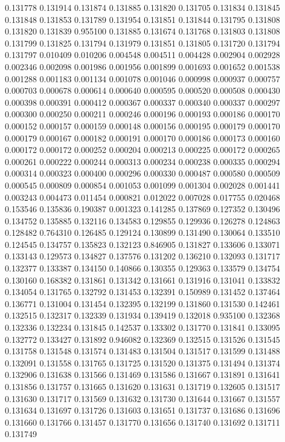 0.131778
0.131914
0.131874
0.131885
0.131820
0.131705
0.131834
0.131845
0.131848
0.131853
0.131789
0.131954
0.131851
0.131844
0.131795
0.131808
0.131820
0.131839
0.955100
0.131885
0.131674
0.131768
0.131803
0.131808
0.131799
0.131825
0.131794
0.131979
0.131851
0.131805
0.131720
0.131794
0.131797
0.010409
0.010206
0.004548
0.004511
0.004428
0.002904
0.002928
0.002346
0.002098
0.001986
0.001956
0.001899
0.001693
0.001652
0.001538
0.001288
0.001183
0.001134
0.001078
0.001046
0.000998
0.000937
0.000757
0.000703
0.000678
0.000614
0.000640
0.000595
0.000520
0.000508
0.000430
0.000398
0.000391
0.000412
0.000367
0.000337
0.000340
0.000337
0.000297
0.000300
0.000250
0.000211
0.000246
0.000196
0.000193
0.000186
0.000170
0.000152
0.000157
0.000159
0.000148
0.000156
0.000195
0.000179
0.000170
0.000179
0.000167
0.000182
0.000191
0.000170
0.000186
0.000173
0.000160
0.000172
0.000172
0.000252
0.000204
0.000213
0.000225
0.000172
0.000265
0.000261
0.000222
0.000244
0.000313
0.000234
0.000238
0.000335
0.000294
0.000314
0.000323
0.000400
0.000296
0.000330
0.000487
0.000580
0.000509
0.000545
0.000809
0.000854
0.001053
0.001099
0.001304
0.002028
0.001441
0.003243
0.004473
0.011454
0.000821
0.012022
0.007028
0.017755
0.020468
0.153546
0.135836
0.190387
0.001323
0.141285
0.137869
0.127352
0.130496
0.134752
0.135885
0.132116
0.134583
0.129855
0.129936
0.126278
0.124863
0.128482
0.764310
0.126485
0.129124
0.130899
0.131490
0.130064
0.133510
0.124545
0.134757
0.135823
0.132123
0.846905
0.131827
0.133606
0.133071
0.133143
0.129573
0.134827
0.137576
0.131202
0.136210
0.132093
0.131717
0.132377
0.133387
0.134150
0.140866
0.130355
0.129363
0.133579
0.134754
0.130160
0.168382
0.131861
0.131342
0.131661
0.131916
0.131041
0.133832
0.134054
0.131765
0.132792
0.131453
0.132391
0.150989
0.131452
0.137464
0.136771
0.131004
0.131454
0.132395
0.132199
0.131860
0.131530
0.142461
0.132515
0.132317
0.132339
0.131934
0.139419
0.132018
0.935100
0.132368
0.132336
0.132234
0.131845
0.142537
0.133302
0.131770
0.131841
0.133095
0.132772
0.133427
0.131892
0.946082
0.132369
0.132515
0.131526
0.131545
0.131758
0.131548
0.131574
0.131483
0.131504
0.131517
0.131599
0.131488
0.132091
0.131558
0.131765
0.131725
0.131520
0.131375
0.131494
0.131374
0.132906
0.131638
0.131566
0.131469
0.131586
0.131667
0.131891
0.131641
0.131856
0.131757
0.131665
0.131620
0.131631
0.131719
0.132605
0.131517
0.131630
0.131717
0.131569
0.131632
0.131730
0.131644
0.131667
0.131557
0.131634
0.131697
0.131726
0.131603
0.131651
0.131737
0.131686
0.131696
0.131660
0.131766
0.131457
0.131770
0.131656
0.131740
0.131692
0.131711
0.131749

